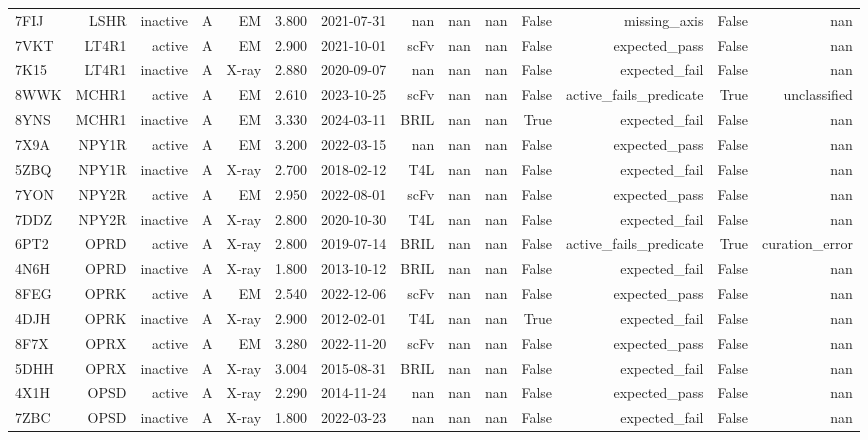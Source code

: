 \begin{longtable}{lrrrrrrrrrrrrr}
7FIJ & LSHR & inactive & A & EM & 3.800 & 2021-07-31 & nan & nan & nan & False & missing\_axis & False & nan \\
7VKT & LT4R1 & active & A & EM & 2.900 & 2021-10-01 & scFv & nan & nan & False & expected\_pass & False & nan \\
7K15 & LT4R1 & inactive & A & X-ray & 2.880 & 2020-09-07 & nan & nan & nan & False & expected\_fail & False & nan \\
8WWK & MCHR1 & active & A & EM & 2.610 & 2023-10-25 & scFv & nan & nan & False & active\_fails\_predicate & True & unclassified \\
8YNS & MCHR1 & inactive & A & EM & 3.330 & 2024-03-11 & BRIL & nan & nan & True & expected\_fail & False & nan \\
7X9A & NPY1R & active & A & EM & 3.200 & 2022-03-15 & nan & nan & nan & False & expected\_pass & False & nan \\
5ZBQ & NPY1R & inactive & A & X-ray & 2.700 & 2018-02-12 & T4L & nan & nan & False & expected\_fail & False & nan \\
7YON & NPY2R & active & A & EM & 2.950 & 2022-08-01 & scFv & nan & nan & False & expected\_pass & False & nan \\
7DDZ & NPY2R & inactive & A & X-ray & 2.800 & 2020-10-30 & T4L & nan & nan & False & expected\_fail & False & nan \\
6PT2 & OPRD & active & A & X-ray & 2.800 & 2019-07-14 & BRIL & nan & nan & False & active\_fails\_predicate & True & curation\_error \\
4N6H & OPRD & inactive & A & X-ray & 1.800 & 2013-10-12 & BRIL & nan & nan & False & expected\_fail & False & nan \\
8FEG & OPRK & active & A & EM & 2.540 & 2022-12-06 & scFv & nan & nan & False & expected\_pass & False & nan \\
4DJH & OPRK & inactive & A & X-ray & 2.900 & 2012-02-01 & T4L & nan & nan & True & expected\_fail & False & nan \\
8F7X & OPRX & active & A & EM & 3.280 & 2022-11-20 & scFv & nan & nan & False & expected\_pass & False & nan \\
5DHH & OPRX & inactive & A & X-ray & 3.004 & 2015-08-31 & BRIL & nan & nan & False & expected\_fail & False & nan \\
4X1H & OPSD & active & A & X-ray & 2.290 & 2014-11-24 & nan & nan & nan & False & expected\_pass & False & nan \\
7ZBC & OPSD & inactive & A & X-ray & 1.800 & 2022-03-23 & nan & nan & nan & False & expected\_fail & False & nan \\

\end{longtable}
